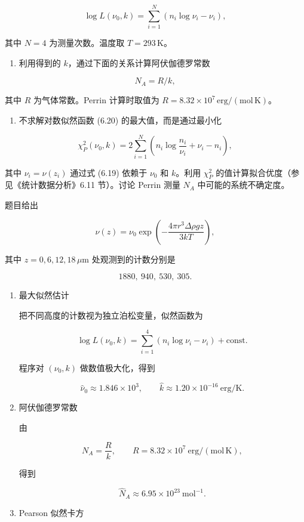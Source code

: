 \begin{question}
\[
\log L(\nu_0,k)=\sum_{i=1}^{N}(n_i\log\nu_i-\nu_i),
\]

其中 \(N=4\) 为测量次数。温度取 \(T=293\,\mathrm{K}\)。

\begin{enumerate}[start=2]
\item
  利用得到的 \(k\)，通过下面的关系计算阿伏伽德罗常数
\end{enumerate}

\[
N_A=R/k,
\]

其中 \(R\) 为气体常数。Perrin 计算时取值为
\(R=8.32\times10^7\,\mathrm{erg/(mol\,K)}\)。

\begin{enumerate}[start=3]
\item
  不求解对数似然函数 (6.20) 的最大值，而是通过最小化
\end{enumerate}

\[
\chi_P^2(\nu_0,k)=2\sum_{i=1}^{N}\left(n_i\log\frac{n_i}{\nu_i}+\nu_i-n_i\right),
\]

其中 \(\nu_i=\nu(z_i)\) 通过式 (6.19) 依赖于 \(\nu_0\) 和 \(k\)。利用
\(\chi_P^2\) 的值计算拟合优度（参见《统计数据分析》6.11 节）。讨论
Perrin 测量 \(N_A\) 中可能的系统不确定度。
\begin{solution}
题目给出

\[
\nu(z)=\nu_0\exp\left(-\frac{4\pi r^3\Delta\rho gz}{3kT}\right),
\]

其中 \(z=0,6,12,18\,\mu\mathrm m\) 处观测到的计数分别是

\[
1880,\ 940,\ 530,\ 305.
\]

\begin{enumerate}
\item 最大似然估计

把不同高度的计数视为独立泊松变量，似然函数为

\[
\log L(\nu_0,k)=\sum_{i=1}^4(n_i\log\nu_i-\nu_i)+\text{const}.
\]

程序对 \((\nu_0,k)\) 做数值极大化，得到

\[
\hat\nu_0\approx1.846\times10^3,
\qquad
\hat k\approx1.20\times10^{-16}\ \mathrm{erg/K}.
\]

\item 阿伏伽德罗常数

由

\[
N_A=\frac{R}{k},\qquad R=8.32\times10^7\ \mathrm{erg/(mol\,K)},
\]

得到

\[
\hat N_A\approx6.95\times10^{23}\ \mathrm{mol}^{-1}.
\]

\item Pearson 似然卡方


\end{enumerate}
\end{solution}
\end{question}
